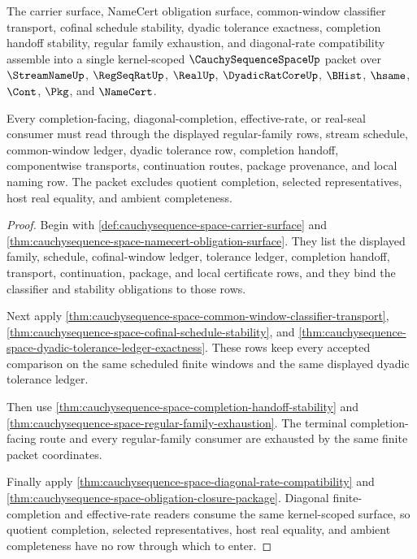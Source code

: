 \begin{theorem}
\label{thm:cauchysequence-space-kernel-scope-packet}
The carrier surface, NameCert obligation surface, common-window classifier transport, cofinal schedule stability, dyadic tolerance exactness, completion handoff stability, regular family exhaustion, and diagonal-rate compatibility assemble into a single kernel-scoped $\CauchySequenceSpaceUp$ packet over $\StreamNameUp$, $\RegSeqRatUp$, $\RealUp$, $\DyadicRatCoreUp$, $\BHist$, $\hsame$, $\Cont$, $\Pkg$, and $\NameCert$.

Every completion-facing, diagonal-completion, effective-rate, or real-seal consumer must read through the displayed regular-family rows, stream schedule, common-window ledger, dyadic tolerance row, completion handoff, componentwise transports, continuation routes, package provenance, and local naming row. The packet excludes quotient completion, selected representatives, host real equality, and ambient completeness.
\end{theorem}
\begin{proof}
Begin with \autoref{def:cauchysequence-space-carrier-surface} and \autoref{thm:cauchysequence-space-namecert-obligation-surface}. They list the displayed family, schedule, cofinal-window ledger, tolerance ledger, completion handoff, transport, continuation, package, and local certificate rows, and they bind the classifier and stability obligations to those rows.

Next apply \autoref{thm:cauchysequence-space-common-window-classifier-transport}, \autoref{thm:cauchysequence-space-cofinal-schedule-stability}, and \autoref{thm:cauchysequence-space-dyadic-tolerance-ledger-exactness}. These rows keep every accepted comparison on the same scheduled finite windows and the same displayed dyadic tolerance ledger.

Then use \autoref{thm:cauchysequence-space-completion-handoff-stability} and \autoref{thm:cauchysequence-space-regular-family-exhaustion}. The terminal completion-facing route and every regular-family consumer are exhausted by the same finite packet coordinates.

Finally apply \autoref{thm:cauchysequence-space-diagonal-rate-compatibility} and \autoref{thm:cauchysequence-space-obligation-closure-package}. Diagonal finite-completion and effective-rate readers consume the same kernel-scoped surface, so quotient completion, selected representatives, host real equality, and ambient completeness have no row through which to enter.
\end{proof}

